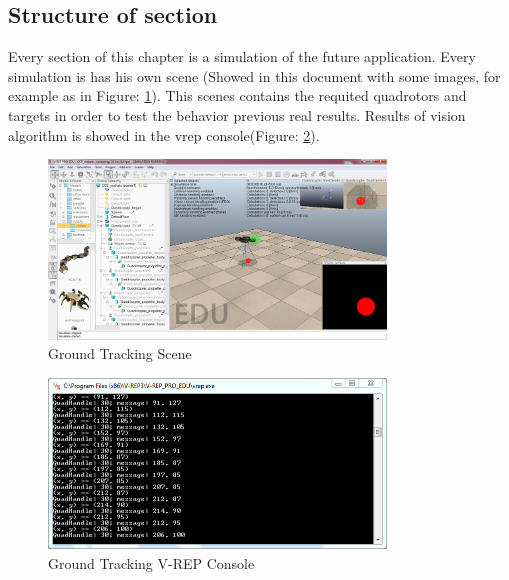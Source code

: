 \subsection{Structure of section}
Every section of this chapter is a simulation of the future application. Every simulation is has his own scene (Showed in this document with some images, for example as in Figure: \ref{fig:VREP_scene_example}). This scenes contains the requited quadrotors and targets in order to test the behavior previous real results. Results of vision algorithm is showed in the vrep console(Figure: \ref{fig:Ground_Tracking_VREP_Console}). \\

\begin{figure}[ht]
	\centering
	\includegraphics[width=0.8\textwidth,natwidth=1366,natheight=728]{../Images/c3/ground_tracking_scene.png}
	\caption{Ground Tracking Scene}
	\label{fig:VREP_scene_example}
\end{figure}

\begin{figure}[ht]
	\centering
	\includegraphics[width=0.8\textwidth,natwidth=677,natheight=342]{../Images/c3/ground_tracking_vrep_console.png}
	\caption{Ground Tracking V-REP Console}
	\label{fig:Ground_Tracking_VREP_Console}
\end{figure}

